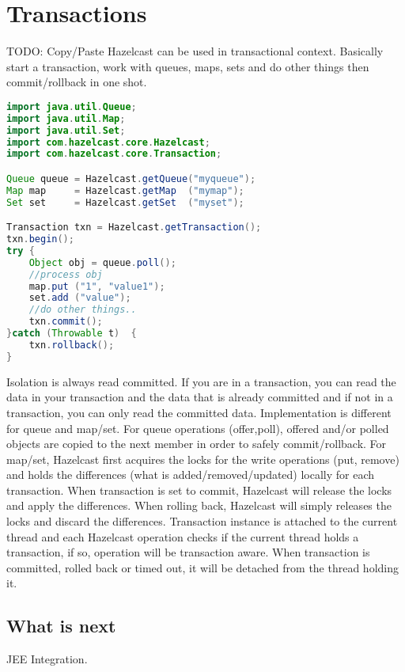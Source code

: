 \chapter{Transactions}
TODO: Copy/Paste
Hazelcast can be used in transactional context. Basically start a transaction, work with queues, maps, sets and do other things then commit/rollback in one shot.

\begin{lstlisting}[language=java]
import java.util.Queue;
import java.util.Map;
import java.util.Set;
import com.hazelcast.core.Hazelcast;
import com.hazelcast.core.Transaction; 

Queue queue = Hazelcast.getQueue("myqueue");
Map map     = Hazelcast.getMap  ("mymap");
Set set     = Hazelcast.getSet  ("myset");

Transaction txn = Hazelcast.getTransaction();
txn.begin();
try {    
    Object obj = queue.poll();
    //process obj
    map.put ("1", "value1");
    set.add ("value");
    //do other things..
    txn.commit();
}catch (Throwable t)  {
    txn.rollback();
}
\end{lstlisting}

Isolation is always read committed. If you are in a transaction, you can read the data in your transaction and the data that is already committed and if not in a transaction, you can only read the committed data. Implementation is different for queue and map/set. For queue operations (offer,poll), offered and/or polled objects are copied to the next member in order to safely commit/rollback. For map/set, Hazelcast first acquires the locks for the write operations (put, remove) and holds the differences (what is added/removed/updated) locally for each transaction. When transaction is set to commit, Hazelcast will release the locks and apply the differences. When rolling back, Hazelcast will simply releases the locks and discard the differences. Transaction instance is attached to the current thread and each Hazelcast operation checks if the current thread holds a transaction, if so, operation will be transaction aware. When transaction is committed, rolled back or timed out, it will be detached from the thread holding it.

\section{What is next}
JEE Integration.
